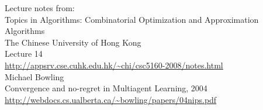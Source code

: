 \documentclass[a4paper,12pt]{article}
\begin{document}
 Lecture notes from: \\ 
 Topics in Algorithms: Combinatorial Optimization and Approximation Algorithms \\
 The Chinese University of Hong Kong \\
 Lecture 14 \\
 \url{http://appsrv.cse.cuhk.edu.hk/~chi/csc5160-2008/notes.html} \\
 
 Michael Bowling \\
 Convergence and no-regret in Multiagent Learning, 2004 \\
 \url{http://webdocs.cs.ualberta.ca/~bowling/papers/04nips.pdf}

\end{document}
